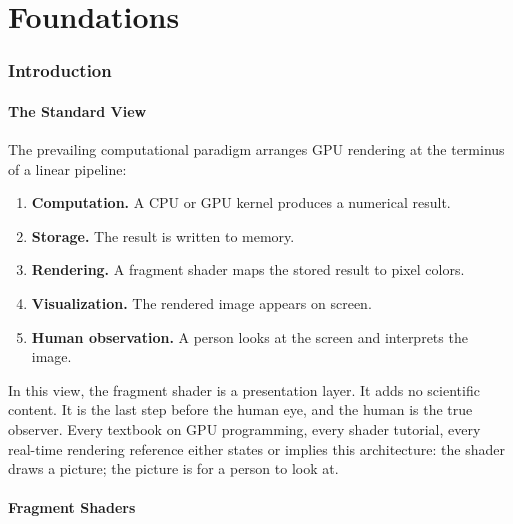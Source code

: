 \documentclass[11pt,twocolumn,a4paper]{article}
\theoremstyle{definition}
\theoremstyle{remark}
\begin{document}

\part{Foundations}

\section{Introduction}
\label{sec:introduction}

\subsection{The Standard View}
\label{sec:standard_view}

The prevailing computational paradigm arranges GPU rendering at the terminus of a linear pipeline:
\begin{enumerate}[nosep]
\item \textbf{Computation.} A CPU or GPU kernel produces a numerical result.
\item \textbf{Storage.} The result is written to memory.
\item \textbf{Rendering.} A fragment shader maps the stored result to pixel colors.
\item \textbf{Visualization.} The rendered image appears on screen.
\item \textbf{Human observation.} A person looks at the screen and interprets the image.
\end{enumerate}
In this view, the fragment shader is a presentation layer. It adds no scientific content. It is the last step before the human eye, and the human is the true observer. Every textbook on GPU programming, every shader tutorial, every real-time rendering reference \citep{akenine2018, owens2007, harris2005} either states or implies this architecture: the shader draws a picture; the picture is for a person to look at.



\subsection{Fragment Shaders}
\label{sec:correct_view}
\end{document}
